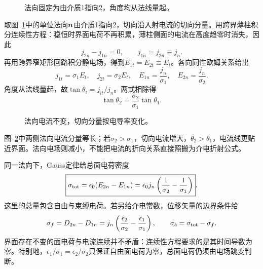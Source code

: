 \begin{figure}[H]\centering
{}
\caption{法向固定为由介质1指向2，角度均从法线量起。}\label{fig:c1-interface-q}
\end{figure}
\begin{solution}
取图~\ref{fig:c1-interface-q}中的单位法向$\bm{n}$由介质1指向2，切向沿入射电流的切向分量。用跨界薄柱积分连续性方程：稳恒时界面电荷不再积累，薄柱侧面的电流在高度趋零时消失，因此
\[
 j_{2n}-j_{1n}=0,\qquad j_{1n}=j_{2n}\equiv j_n.
\]
再用跨界窄矩形回路积分静电场，得到$E_{1t}=E_{2t}\equiv E_t$。各向同性欧姆关系给出
\[
 j_{1t}=\sigma_1E_t,\quad j_{2t}=\sigma_2E_t,\quad
 E_{1n}=\frac{j_n}{\sigma_1},\quad E_{2n}=\frac{j_n}{\sigma_2}.
\]
角度从法线量起，故$\tan\theta_i=j_{it}/j_n$。两式相除得
\[
 \boxed{\tan\theta_2=\frac{\sigma_2}{\sigma_1}\tan\theta_1}.
\]
\begin{figure}[H]\centering
{}
\caption{法向电流不变，切向分量按电导率变化。}\label{fig:c1-interface-s}
\end{figure}
图~\ref{fig:c1-interface-s}中两侧法向电流分量等长；若$\sigma_2>\sigma_1$，切向电流增大，$\theta_2>\theta_1$，电流线更贴近界面。法向电场则减小，不能把电流的折向关系直接照搬为介电折射公式。

同一法向下，Gauss定律给总面电荷密度
\[
 \boxed{\sigma_{\rm tot}=\epsilon_0(E_{2n}-E_{1n})
 =\epsilon_0j_n\left(\frac1{\sigma_2}-\frac1{\sigma_1}\right)}.
\]
这里的总量包含自由与束缚电荷。若另给介电常数，位移矢量的边界条件给
\[
 \sigma_f=D_{2n}-D_{1n}
 =j_n\left(\frac{\epsilon_2}{\sigma_2}-\frac{\epsilon_1}{\sigma_1}\right),\qquad
 \sigma_b=\sigma_{\rm tot}-\sigma_f.
\]
界面存在不变的面电荷与电流连续并不矛盾：连续性方程要求的是其时间导数为零。特别地，$\epsilon_1/\sigma_1=\epsilon_2/\sigma_2$只保证自由面电荷为零，总面电荷仍须由电场跳变判断。
\end{solution}


